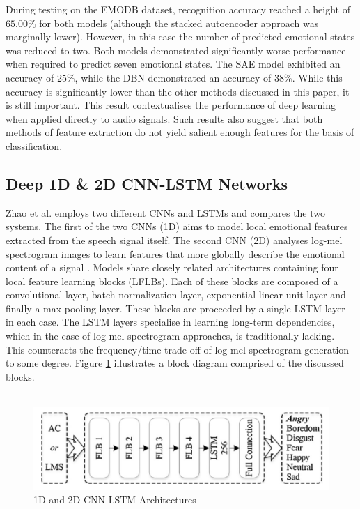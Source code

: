 During testing on the EMODB dataset, recognition accuracy reached a height of $65.00\%$ for both models (although the stacked autoencoder approach was marginally lower). However, in this case the number of predicted emotional states was reduced to two. Both models demonstrated significantly worse performance when required to predict seven emotional states. The SAE model exhibited an accuracy of $25\%$, while the DBN demonstrated an accuracy of $38\%$. While this accuracy is significantly lower than the other methods discussed in this paper, it is still important. This result contextualises the performance of deep learning when applied directly to audio signals. Such results also suggest that both methods of feature extraction do not yield salient enough features for the basis of classification.

\subsection{Deep 1D \& 2D CNN-LSTM Networks}
Zhao et al. employs two different CNNs and LSTMs and compares the two systems. The first of the two CNNs (1D) aims to model local emotional features extracted from the speech signal itself. The second CNN (2D) analyses log-mel spectrogram images to learn features that more globally describe the emotional content of a signal \cite{ZHAO2019}. Models share closely related architectures containing four local feature learning blocks (LFLBs). Each of these blocks are composed of a convolutional layer, batch normalization layer, exponential linear unit layer and finally a max-pooling layer. These blocks are proceeded by a single LSTM layer in each case. The LSTM layers specialise in learning long-term dependencies, which in the case of log-mel spectrogram approaches, is traditionally lacking. This counteracts the frequency/time trade-off of log-mel spectrogram generation to some degree. Figure \ref{zhao2019_arch_fig} illustrates a block diagram comprised of the discussed blocks.\\ \\
\begin{figure}[h]
        \centering
        \includegraphics[scale = 1.0]{images/zhao_architecture.png}
        \caption{1D and 2D CNN-LSTM Architectures \cite{ZHAO2019}}
        \label{zhao2019_arch_fig}
\end{figure}
